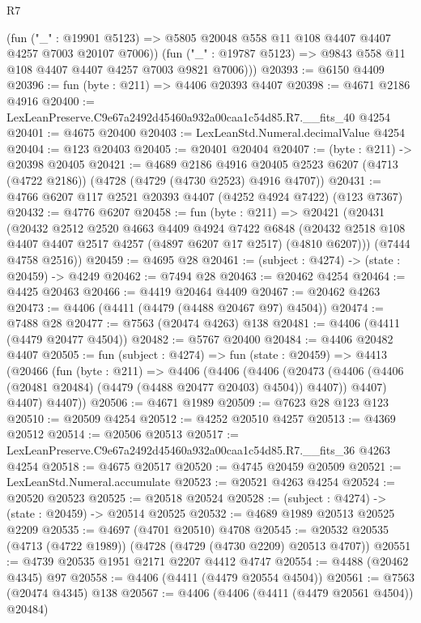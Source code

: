 \begin{lexlean}{R7}
\begin{coremodule}
          (fun ("_" : @19901 @5123) =>
          @5805 @20048 @558 @11 @108 @4407 @4407 @4257 @7003 @20107 @7006))
        (fun ("_" : @19787 @5123) => @9843 @558 @11 @108 @4407 @4407 @4257 @7003 @9821 @7006)))
@20393 := @6150 @4409
@20396 := fun (byte : @211) => @4406 @20393 @4407
@20398 := @4671 @2186 @4916
@20400 := LexLeanPreserve.C9e67a2492d45460a932a00caa1c54d85.R7.__fits_40 @4254
@20401 := @4675 @20400
@20403 := LexLeanStd.Numeral.decimalValue @4254
@20404 := @123 @20403
@20405 := @20401 @20404
@20407 := (byte : @211) -> @20398 @20405
@20421 := @4689
    @2186
    @4916
    @20405
    @2523
    @6207
    (@4713 (@4722 @2186))
    (@4728 (@4729 (@4730 @2523) @4916 @4707))
@20431 := @4766 @6207 @117 @2521 @20393 @4407 (@4252 @4924 @7422) (@123 @7367)
@20432 := @4776 @6207
@20458 := fun (byte : @211) =>
  @20421
    (@20431
      (@20432
        @2512
        @2520
        @4663
        @4409
        @4924
        @7422
        @6848
        (@20432 @2518 @108 @4407 @4407 @2517 @4257 (@4897 @6207 @17 @2517) (@4810 @6207)))
      (@7444 @4758 @2516))
@20459 := @4695 @28
@20461 := (subject : @4274) -> (state : @20459) -> @4249
@20462 := @7494 @28
@20463 := @20462 @4254
@20464 := @4425 @20463
@20466 := @4419 @20464 @4409
@20467 := @20462 @4263
@20473 := @4406 (@4411 (@4479 (@4488 @20467 @97) @4504))
@20474 := @7488 @28
@20477 := @7563 (@20474 @4263) @138
@20481 := @4406 (@4411 (@4479 @20477 @4504))
@20482 := @5767 @20400
@20484 := @4406 @20482 @4407
@20505 := fun (subject : @4274) =>
  fun (state : @20459) =>
  @4413
    (@20466
      (fun (byte : @211) =>
      @4406
        (@4406
          (@4406
            (@20473 (@4406 (@4406 (@20481 @20484) (@4479 (@4488 @20477 @20403) @4504)) @4407))
            @4407)
          @4407)
        @4407))
@20506 := @4671 @1989
@20509 := @7623 @28 @123 @123
@20510 := @20509 @4254
@20512 := @4252 @20510 @4257
@20513 := @4369 @20512
@20514 := @20506 @20513
@20517 := LexLeanPreserve.C9e67a2492d45460a932a00caa1c54d85.R7.__fits_36 @4263 @4254
@20518 := @4675 @20517
@20520 := @4745 @20459 @20509
@20521 := LexLeanStd.Numeral.accumulate
@20523 := @20521 @4263 @4254
@20524 := @20520 @20523
@20525 := @20518 @20524
@20528 := (subject : @4274) -> (state : @20459) -> @20514 @20525
@20532 := @4689 @1989 @20513 @20525 @2209
@20535 := @4697 (@4701 @20510) @4708
@20545 := @20532 @20535 (@4713 (@4722 @1989)) (@4728 (@4729 (@4730 @2209) @20513 @4707))
@20551 := @4739 @20535 @1951 @2171 @2207 @4412 @4747
@20554 := @4488 (@20462 @4345) @97
@20558 := @4406 (@4411 (@4479 @20554 @4504))
@20561 := @7563 (@20474 @4345) @138
@20567 := @4406 (@4406 (@4411 (@4479 @20561 @4504)) @20484)

\end{coremodule}
\end{lexlean}
